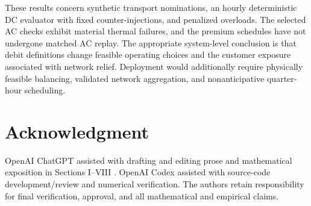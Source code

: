 \documentclass[10pt,journal]{IEEEtran}
\begin{document}
These results concern synthetic transport nominations, an hourly deterministic DC evaluator with fixed counter-injections, and penalized overloads. The selected AC checks exhibit material thermal failures, and the premium schedules have not undergone matched AC replay. The appropriate system-level conclusion is that debit definitions change feasible operating choices and the customer exposure associated with network relief. Deployment would additionally require physically feasible balancing, validated network aggregation, and nonanticipative quarter-hour scheduling.

\section*{Acknowledgment}
OpenAI ChatGPT assisted with drafting and editing prose and mathematical exposition in Sections I--VIII \cite{OpenAI2026}. OpenAI Codex assisted with source-code development/review and numerical verification. The authors retain responsibility for final verification, approval, and all mathematical and empirical claims.



\end{document}
